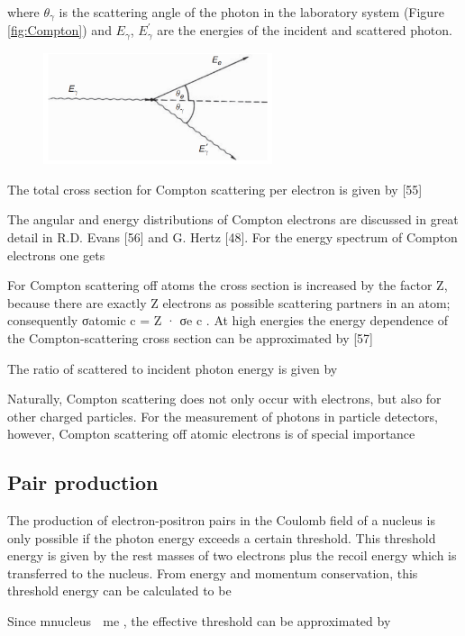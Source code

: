 where $\theta_\gamma$ is the scattering angle of 
the photon in the laboratory system (Figure \ref{fig:Compton}) and $E_\gamma$, $E^'_\gamma$
are the energies of the incident and scattered photon. 
\begin{figure}[!h]
    \centering
    \includegraphics[width =0.6\textwidth]{figures/png/Screenshot_20240731_144138.png}
    \caption{}
    \label{fig:anglesinmuon}
\end{figure}


The total cross section for Compton scattering per electron is
given by [55]


The angular and energy distributions of Compton electrons are discussed
in great detail in R.D. Evans [56] and G. Hertz [48]. For the energy
spectrum of Compton electrons one gets

For Compton scattering off atoms the cross section is increased by the factor Z, because there are exactly Z electrons as possible scattering partners
in an atom; consequently σatomic
c = Z · σe
c .
At high energies the energy dependence of the Compton-scattering cross
section can be approximated by [57]

The ratio of scattered to incident photon energy is given by

Naturally, Compton scattering does not only occur with electrons, but
also for other charged particles. For the measurement of photons in particle detectors, however, Compton scattering off atomic electrons is of
special importance
\subsection{Pair production}
The production of electron-positron pairs in the Coulomb field of a
nucleus is only possible if the photon energy exceeds a certain threshold.
This threshold energy is given by the rest masses of two electrons plus
the recoil energy which is transferred to the nucleus. From energy and
momentum conservation, this threshold energy can be calculated to be

Since mnucleus  me , the effective threshold can be approximated by

